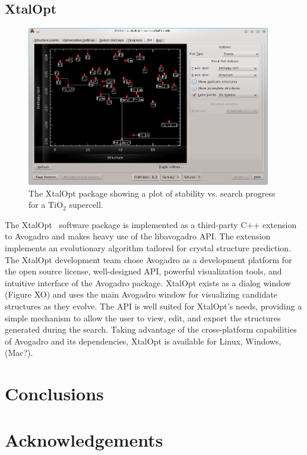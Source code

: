 \documentclass[10pt]{bmc_article}
\newenvironment{bmcformat}{\begin{raggedright}
\baselineskip20pt\sloppy\setboolean{publ}{false}}{\end{raggedright}
\baselineskip20pt\sloppy}
\begin{document}
\begin{bmcformat}
\subsection{XtalOpt}

\begin{figure}
  \includegraphics[width=0.95\textwidth]{images/xtalopt}
  \caption{The XtalOpt package showing a plot of stability vs. search progress
    for a $\mathrm{TiO_2}$ supercell.}
  \label{f:xtalopt}
\end{figure}

The XtalOpt~\cite{xo1, xo2} software package is implemented as a third-party C++
extension to Avogadro and makes heavy use of the libavogadro API. The extension
implements an evolutionary algorithm tailored for crystal structure prediction.
The XtalOpt development team chose Avogadro as a development platform for the
open source license, well-designed API, powerful visualization tools, and
intuitive interface of the Avogadro package. XtalOpt exists as a dialog window
(Figure XO) and uses the main Avogadro window for visualizing candidate
structures as they evolve. The API is well suited for XtalOpt’s needs,
providing a simple mechanism to allow the user to view, edit, and export the
structures generated during the search. Taking advantage of the cross-platform
capabilities of Avogadro and its dependencies, XtalOpt is available for Linux,
Windows, (Mac?).

\section{Conclusions}

\section{Acknowledgements}


\end{bmcformat}
\end{document}
